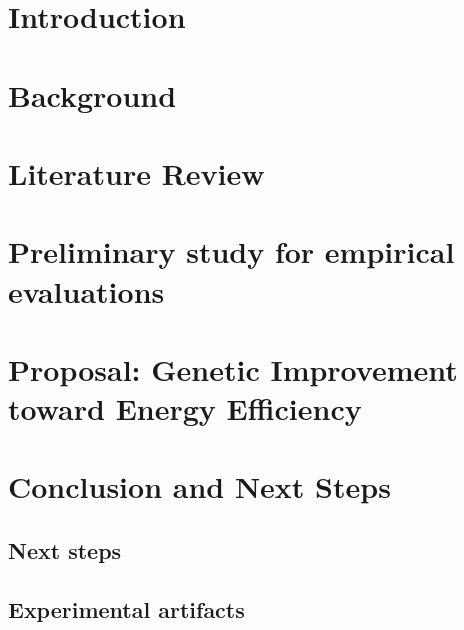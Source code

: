 \documentclass[a4paper,11pt,english,openany]{book}
\begin{document}
\newpage
{} %

\chapter{Introduction}
\label{ch:Introduction}


\chapter{Background}


\chapter{Literature Review}
\label{ch:literature_review}


\chapter{Preliminary study for empirical evaluations}
\label{ch:prem_study}


\chapter{Proposal: Genetic Improvement toward Energy Efficiency}
\label{ch:solution}


\chapter{Conclusion and Next Steps}\label{ch:conclusion}

\section{Next steps}\label{sec:nextSteps}



\begin{appendices}

\chapter{Experimental artifacts}


\end{appendices}

{}


\end{document}
